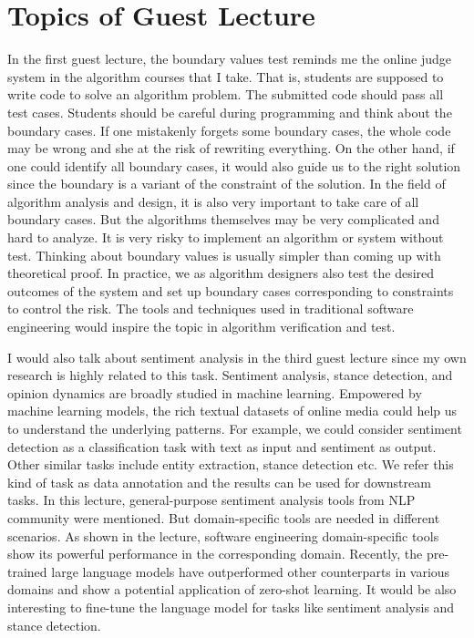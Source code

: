 \documentclass[11pt]{article}
\begin{document}
\section{Topics of Guest Lecture}	

In the first guest lecture, the boundary values test reminds me the online judge system in the algorithm courses that I take. That is, students are supposed to write code to solve an algorithm problem. The submitted code should pass all test cases. Students should be careful during programming and think about the boundary cases. If one mistakenly forgets some boundary cases, the whole code may be wrong and she at the risk of rewriting everything. On the other hand, if one could identify all boundary cases, it would also guide us to the right solution since the boundary is a variant of the constraint of the solution. In the field of algorithm analysis and design, it is also very important to take care of all boundary cases. But the algorithms themselves may be very complicated and hard to analyze. It is very risky to implement an algorithm or system without test. Thinking about boundary values is usually simpler than coming up with theoretical proof. In practice, we as algorithm designers also test the desired outcomes of the system and set up boundary cases corresponding to constraints to control the risk. The tools and techniques used in traditional software engineering would inspire the topic in algorithm verification and test.

I would also talk about sentiment analysis in the third guest lecture since my own research is highly related to this task. Sentiment analysis, stance detection, and opinion dynamics are broadly studied in machine learning.  Empowered by machine learning models, the rich textual datasets of online media could help us to understand the underlying patterns. For example, we could consider sentiment detection as a classification task with text as input and sentiment as output. Other similar tasks include entity extraction, stance detection etc. We refer this kind of task as data annotation and the results can be used for downstream tasks. In this lecture, general-purpose sentiment analysis tools from NLP community were mentioned. But domain-specific tools are needed in different scenarios. As shown in the lecture, software engineering domain-specific tools show its powerful performance in the corresponding domain. Recently, the pre-trained large language models have outperformed other counterparts in various domains and show a potential application of zero-shot learning. It would be also interesting to fine-tune the language model for tasks like sentiment analysis and stance detection.
\end{document}
